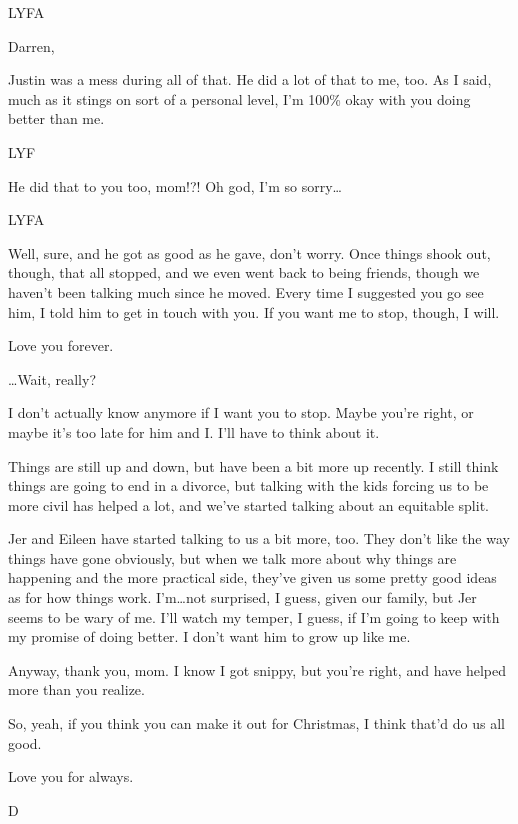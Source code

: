 LYFA

\secdiv{}\newpage

Darren,

Justin was a mess during all of that. He did a lot of that to me, too. As I said, much as it stings on sort of a personal level, I'm 100\% okay with you doing better than me.

LYF

\secdiv{}

He did that to you too, mom!?! Oh god, I'm so sorry\ldots{}

LYFA

\secdiv{}

Well, sure, and he got as good as he gave, don't worry. Once things shook out, though, that all stopped, and we even went back to being friends, though we haven't been talking much since he moved. Every time I suggested you go see him, I told him to get in touch with you. If you want me to stop, though, I will.

Love you forever.

\secdiv{}

\ldots{}Wait, really?

I don't actually know anymore if I want you to stop. Maybe you're right, or maybe it's too late for him and I. I'll have to think about it.

Things are still up and down, but have been a bit more up recently. I still think things are going to end in a divorce, but talking with the kids forcing us to be more civil has helped a lot, and we've started talking about an equitable split.\newpage

Jer and Eileen have started talking to us a bit more, too. They don't like the way things have gone obviously, but when we talk more about why things are happening and the more practical side, they've given us some pretty good ideas as for how things work. I'm\ldots{}not surprised, I guess, given our family, but Jer seems to be wary of me. I'll watch my temper, I guess, if I'm going to keep with my promise of doing better. I don't want him to grow up like me.

Anyway, thank you, mom. I know I got snippy, but you're right, and have helped more than you realize.

So, yeah, if you think you can make it out for Christmas, I think that'd do us all good.

Love you for always.

D
